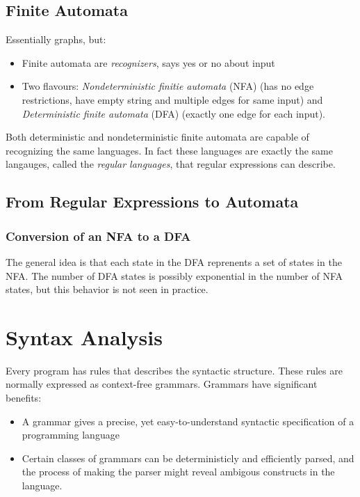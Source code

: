 \documentclass{article}
\begin{document}

\subsection{Finite Automata} %
\label{sub:Finite Automata}
Essentially graphs, but:
\begin{itemize}
	\item Finite automata are \emph{recognizers}, says yes or no about input
	\item Two flavours: \emph{Nondeterministic finitie automata} (NFA) (has no edge restrictions, have empty string and multiple edges for same input) and \emph{Deterministic finite automata} (DFA) (exactly one edge for each input).
\end{itemize}
Both deterministic and nondeterministic finite automata are capable of recognizing the same languages. In fact these languages are exactly the same langauges, called the \emph{regular languages}, that regular expressions can describe.

\subsection{From Regular Expressions to Automata} %
\label{sub:From Regular Expressions to Automata}

\subsubsection{Conversion of an NFA to a DFA} %
\label{ssub:Conversion of an NFA to a DFA}
The general idea is that each state in the DFA reprenents a set of states in the NFA. The number of DFA states is possibly exponential in the number of NFA states, but this behavior is not seen in practice.



\section{Syntax Analysis} %
\label{sec:Syntax Analysis}
Every program has rules that describes the syntactic structure. These rules are normally expressed as context-free grammars. Grammars have significant benefits:
\begin{itemize}
	\item A grammar gives a precise, yet easy-to-understand syntactic specification of a programming language
	\item Certain classes of grammars can be deterministicly and efficiently parsed, and the process of making the parser might reveal ambigous constructs in the language.
\end{itemize}
\end{document}
